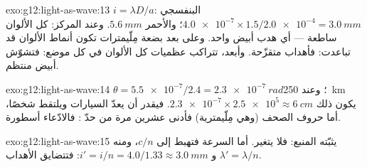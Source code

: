 \begin{solution}{exo:g12:light-as-wave:13}
$i = \lambda D/a$: البنفسجي $\num{4.0e-7} \times 1.5/\num{2.0e-4} =
\qty{3.0}{mm}$؛ والأحمر $\qty{5.6}{mm}$. وعند المركز: كل الألوان ساطعة ---
أي هدب أبيض واحد. وعلى بعد بضعة مِلّيمترات تكون أنماط الألوان قد
تباعدت: فأهداب متقزّحة. وأبعد، تتراكب عظميات كل الألوان
في كل موضع: فتشوّش أبيض منتظم.
\end{solution}

\begin{solution}{exo:g12:light-as-wave:14}
$\theta = \num{5.5e-7}/2.4 = \qty{2.3e-7}{rad}$؛ وعند \qty{250}{km}
يكون ذلك $\num{2.3e-7} \times \num{2.5e5} \approx \qty{6}{cm}$. فيقدر أن
يعدّ السيارات ويلتقط شخصًا، أما حروف الصحف (وهي مِلّيمترية) فأدنى
عشرين مرة من حدّ : فالادّعاء أسطورة.
\end{solution}

\begin{solution}{exo:g12:light-as-wave:15}
 يثبّته المنبع: فلا يتغير. أما السرعة فتهبط إلى
$c/n$، ومنه $\lambda' = \lambda/n$ و
$i' = i/n = 4.0/1.33 \approx \qty{3.0}{mm}$: فتتضايق الأهداب.
\end{solution}

